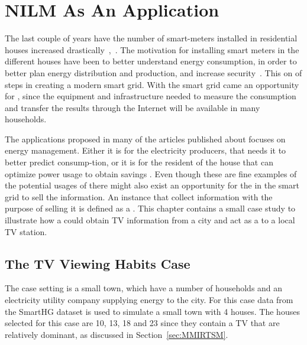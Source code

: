 \chapter{NILM As An Application} 
\label{sec:CaseStudy}
The last couple of years have the number of smart-meters installed in residential houses increased drastically~\citep{RefWorks:44},~\citep{RefWorks:45}. The motivation for installing smart meters in the different houses have been to better understand energy consumption, in order to better plan energy distribution and production, and increase security~\citep{RefWorks:43}. This on of steps in creating a modern smart grid. With the smart grid came an opportunity for , since the equipment and infrastructure needed to measure the consumption and transfer the results through the Internet will be available in many households. 

The applications proposed in many of the articles published about  focuses on energy management. Either it is for the electricity producers, that needs it to better predict consump-tion, or it is for the resident of the house that can optimize power usage to obtain savings \citep{RefWorks:17}. Even though these are fine examples of the potential usages of  there might also exist an opportunity for the  in the smart grid to sell the  information. An instance that collect information with the purpose of selling it is defined as a . This chapter contains a small case study to illustrate how a  could obtain TV information from a city and act as a  to a local TV station. 

\section{The TV Viewing Habits Case}
The case setting is a small town, which have a number of households and an electricity utility company supplying energy to the city. For this case data from the SmartHG dataset is used to simulate a small town with 4 houses. The houses selected for this case are 10, 13, 18 and 23  since they contain a TV that are relatively dominant, as discussed in Section~\ref{sec:MMIRTSM}. 

